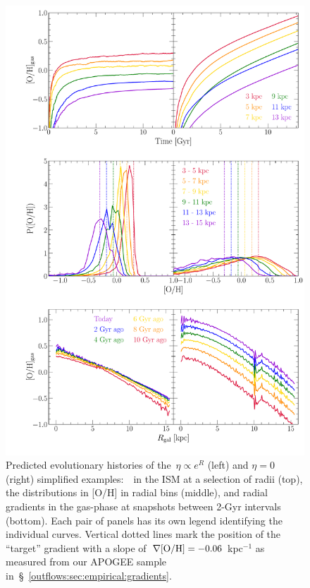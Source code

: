 \begin{figure}
\centering
\includegraphics[scale = 0.5]{simplified-examples.pdf}
\caption{
Predicted evolutionary histories of the~$\eta \propto e^R$ (left) and
$\eta = 0$ (right) simplified examples:~\oh~in the ISM at a selection of radii
(top), the distributions in [O/H] in radial bins (middle), and radial
gradients in the gas-phase at snapshots between 2-Gyr intervals (bottom).
Each pair of panels has its own legend identifying the individual curves.
Vertical dotted lines mark the position of the ``target'' gradient with a
slope of~$\nabla\text{[O/H]} = -0.06$ kpc$^{-1}$ as measured from our APOGEE sample
in~\S~\ref{outflows:sec:empirical:gradients}.
}
\label{outflows:fig:simplified-examples}
\end{figure}


